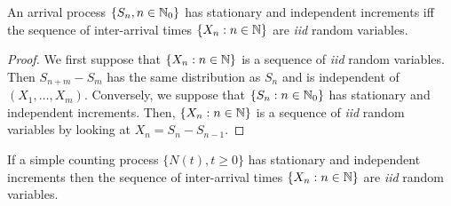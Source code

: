 \documentclass[a4paper,10pt,english]{article}
\begin{document}
\begin{lem} 
An arrival process $\{S_n, n \in \mathbb{N}_0\}$ has stationary and independent increments iff 
the sequence of inter-arrival times $\{X_n: n \in \mathbb{N}\}$ are \textit{iid} random variables.
\end{lem}
\begin{proof} 
We first suppose that $\{X_n: n \in \mathbb{N}\}$ is a sequence of \textit{iid} random variables. 
Then $S_{n+m} - S_m$ has the same distribution as $S_n$ and is independent of $(X_1, \ldots, X_m)$. 
Conversely, we suppose that $\{S_n: n \in \mathbb{N}_0\}$ has stationary and independent increments. 
Then, $\{X_n: n \in \mathbb{N}\}$ is a sequence of \textit{iid} random variables by looking at $X_n = S_n - S_{n-1}$.   
\end{proof}

\begin{lem} If a simple counting process $\{N(t), t \geqslant 0\}$ has stationary and independent increments then 
the sequence of inter-arrival times $\{X_n: n \in \mathbb{N}\}$ are \textit{iid} random variables.
\end{lem}
\end{document}

